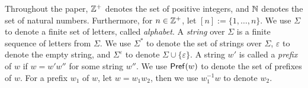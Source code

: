 
\medskip

Throughout the paper, $\mathbb{Z}^+$ denotes the set of positive integers, and  $\mathbb{N}$ denotes the set of natural numbers. Furthermore, for $n\in \mathbb{Z}^+$, let $[n]:=\{1, \ldots, n\}$. 
%
We use $\Sigma$ to denote a finite set of letters, called \emph{alphabet}. A \emph{string} over $\Sigma$ is a finite sequence of letters from $\Sigma$. We use $\Sigma^*$ to denote the set of strings over $\Sigma$, $\varepsilon$ to denote the empty string, and $\Sigma^\varepsilon$ to denote $\Sigma \cup \{\varepsilon\}$. A string $w'$ is called a \emph{prefix} of $w$ if $w = w'w''$ for some string $w''$. We use $\mathsf{Pref}(w)$ to denote the set of prefixes of $w$. For a prefix $w_1$ of $w$, let $w = w_1 w_2$, then we use $w_1^{-1}w$ to denote $w_2$.



